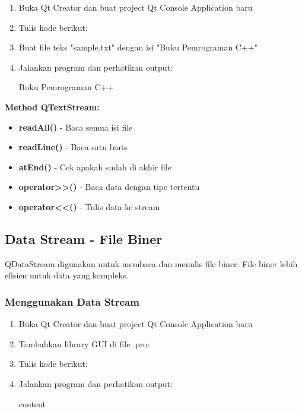 \begin{enumerate}
\item Buka Qt Creator dan buat project Qt Console Application baru
\item Tulis kode berikut:



\item Buat file teks "sample.txt" dengan isi "Buku Pemrograman C++"
\item Jalankan program dan perhatikan output:

\begin{lcverbatim}
Buku Pemrograman C++
\end{lcverbatim}
\end{enumerate}

\textbf{Method QTextStream:}
\begin{itemize}
\item \textbf{readAll()} - Baca semua isi file
\item \textbf{readLine()} - Baca satu baris
\item \textbf{atEnd()} - Cek apakah sudah di akhir file
\item \textbf{operator>>()} - Baca data dengan tipe tertentu
\item \textbf{operator<<()} - Tulis data ke stream
\end{itemize}

\subsection{Data Stream - File Biner}

QDataStream digunakan untuk membaca dan menulis file biner. File biner lebih efisien untuk data yang kompleks.

\subsubsection{Menggunakan Data Stream}

\begin{enumerate}
\item Buka Qt Creator dan buat project Qt Console Application baru
\item Tambahkan library GUI di file .pro:



\item Tulis kode berikut:



\item Jalankan program dan perhatikan output:

\begin{lcverbatim}
content
\end{lcverbatim}
\end{enumerate}

